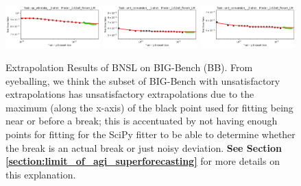\documentclass{article} %
\begin{document}
\begin{figure}
\includegraphics[width=0.325\textwidth]{figures/scaling_laws_benchmark_dataset_plots/__qa_wikidata_,__2-shot_____262M.png}
\includegraphics[width=0.325\textwidth]{figures/scaling_laws_benchmark_dataset_plots/__unit_conversion_,__1-shot_____262M.png}
\includegraphics[width=0.325\textwidth]{figures/scaling_laws_benchmark_dataset_plots/__unit_conversion_,__2-shot_____262M.png}

    \caption{
    Extrapolation Results of BNSL on BIG-Bench (BB). From eyeballing, we think the subset of BIG-Bench with unsatisfactory extrapolations has unsatisfactory extrapolations due to the maximum (along the x-axis) of the black point used for fitting being near or before a break; this is accentuated by not having enough points for fitting for the SciPy fitter to be able to determine whether the break is an actual break or just noisy deviation. \textbf{See Section \ref{section:limit_of_agi_superforecasting}} for more details on this explanation.
    }
    \label{fig:scaling_laws_benchmark_dataset__big_bench}
\end{figure}
\end{document}
